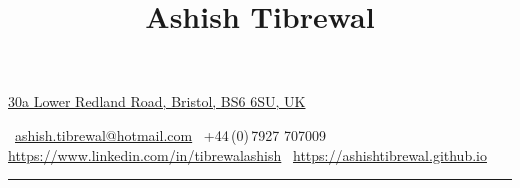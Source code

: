 \documentclass[a4paper,10pt,oneside]{article}
\begin{document}

\title{Ashish Tibrewal}

\begin{subtitle}
\href{https://www.google.co.uk/maps/place/30+Lower+Redland+Rd,+Bristol+BS6+6SU/}
{30a Lower Redland Road, Bristol, BS6 6SU, UK}
\par
\faEnvelope\,
\href{mailto:ashish.tibrewal@hotmail.com}
{ashish.tibrewal@hotmail.com}
\hfill \faPhone\,
+44\,(0)\,7927 707009
\hfill \faLinkedinSquare\,
\href{https://www.linkedin.com/in/tibrewalashish}
{https://www.linkedin.com/in/tibrewalashish}
\hfill \faBriefcase\,
\href{https://ashishtibrewal.github.io}
{https://ashishtibrewal.github.io}
\vspace{8pt}
\hrule
\end{subtitle}
\end{document}
